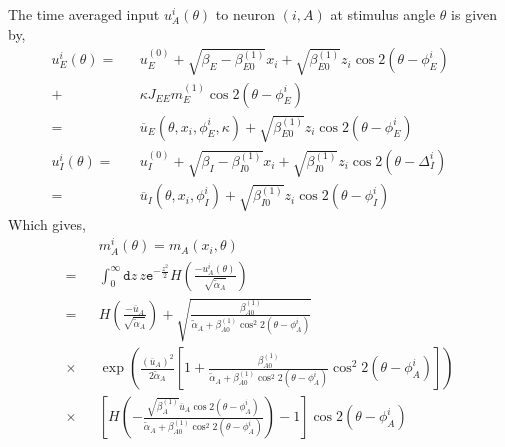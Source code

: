 The time averaged input $u_A^{i} (\theta)$ to neuron $(i, A)$ at stimulus angle $\theta$ is given by, 
\begin{eqnarray}
u_E^{i} (\theta) =&& u^{(0)}_E + \sqrt{\beta_E - \beta_{E0}^{(1)}} x_i +  \sqrt{\beta_{E0}^{(1)}} z_i \cos 2 (\theta - \phi_E^i) \,\,\,\, \,\,\,\,\nonumber \\
+&& \kappa J_{EE} m_E^{(1)} \cos 2 ( \theta  - \phi_E^i) \\
=&& \overline{u}_E(\theta, x_i, \phi_E^i, \kappa) +  \sqrt{\beta_{E0}^{(1)}} z_i \cos 2 (\theta - \phi_E^i) \\
u_I^{i} (\theta) =&& u^{(0)}_I + \sqrt{\beta_I - \beta_{I0}^{(1)}} x_i +  \sqrt{\beta_{I0}^{(1)}} z_i \cos 2 (\theta - \Delta_I^i) \\
=&& \overline{u}_I(\theta, x_i, \phi_I^i) +  \sqrt{\beta_{I0}^{(1)}} z_i \cos 2 (\theta - \phi_I^i)
\end{eqnarray}
Which gives, 
\begin{eqnarray}
&&m_A^i(\theta) = m_A(x_i, \theta) \nonumber \\
=&& \int_{0}^{\infty} \mathtt{d} z\,  z \mathtt{e}^{-\frac{z^2}{2}} H\left( \frac{-u_A^i(\theta)}{\sqrt{\tilde{\alpha}_A }} \right)  \\
=&& H\left( \frac{-\overline{u}_A }{\sqrt{\tilde{\alpha}_A }}  \right) + \sqrt{\frac{\beta_{A0}^{(1)} }{  \tilde{\alpha}_A + \beta_{A0}^{(1)} \cos^2 2 (\theta - \phi_A^i) }} \nonumber \\ 
\times&&  \exp \left( \frac{\left( \overline{u}_A \right)^2  }{ 2 \tilde{\alpha}_A} \left[ 1 + \frac{\beta_{A0}^{(1)} }{ \tilde{\alpha}_A + \beta_{A0}^{(1)} \cos^2 2 (\theta - \phi_A^i)  } \cos^2 2 (\theta - \phi_A^i) \right] \right) \nonumber \\
\times&& \left[ H \left( - \frac{ \sqrt{\beta_A^{(1)} } \overline{u}_A \cos 2 (\theta - \phi_A^i)} {  \tilde{\alpha}_A + \beta_{A0}^{(1)} \cos^2 2 (\theta - \phi_A^i) } \right) - 1 \right] \cos2(\theta - \phi_A^i) \label{mAiofTheta} 
\end{eqnarray}

